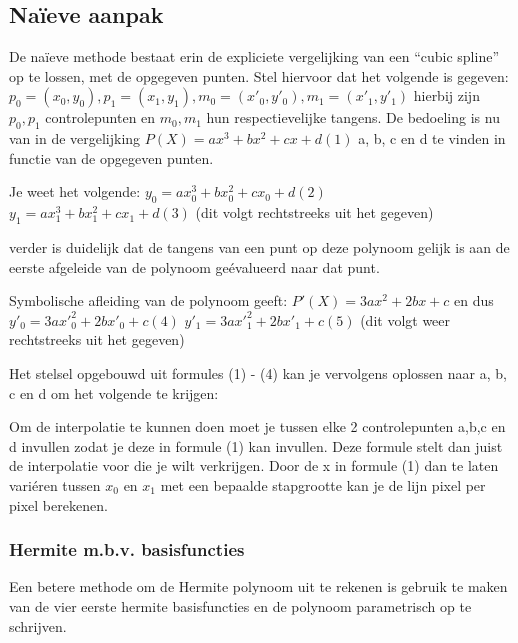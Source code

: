 \documentclass[a4paper,11pt,oneside, titlepage]{article}
\begin{document}
\subsection{Na\"ieve aanpak}
De na\"ieve methode bestaat erin de expliciete vergelijking van een ``cubic spline''
op te lossen, met de opgegeven punten.\newline
Stel hiervoor dat het volgende is gegeven:\newline
$p_0 = (x_0,y_0), p_1 = (x_1,y_1), m_0 = (x'_0, y'_0), m_1 = (x'_1, y'_1)$\newline
hierbij zijn $p_0,p_1$ controlepunten en $m_0, m_1$ hun respectievelijke tangens.\newline
\newline
De bedoeling is nu van in de vergelijking\newline
$P(X) = ax^3 + bx^2 + cx + d (1)$\newline
a, b, c en d te vinden in functie van de opgegeven punten.\newline

Je weet het volgende:
$y_0 = ax_0^3 + bx_0^2 + cx_0 + d (2)$\newline
$y_1 = ax_1^3 + bx_1^2 + cx_1 + d (3)$\newline
(dit volgt rechtstreeks uit het gegeven)\newline

verder is duidelijk dat de tangens van een punt op deze polynoom gelijk is aan de 
eerste afgeleide van de polynoom ge\'evalueerd naar dat punt.\newline

Symbolische afleiding van de polynoom geeft:
$P'(X) = 3ax^2 + 2bx + c$
en dus
$y'_0 = 3a{x'}_0^2 + 2bx'_0 + c (4)$\newline
$y'_1 = 3a{x'}_1^2 + 2bx'_1 + c (5)$\newline
(dit volgt weer rechtstreeks uit het gegeven)\newline

Het stelsel opgebouwd uit formules (1) - (4) kan je vervolgens oplossen naar a, b, c en d
om het volgende te krijgen:

Om de interpolatie te kunnen doen moet je tussen elke 2 controlepunten a,b,c en d invullen
zodat je deze in formule (1) kan invullen. Deze formule stelt dan juist de interpolatie 
voor die je wilt verkrijgen. Door de x in formule (1) dan te laten vari\'eren tussen 
$x_0$ en $x_1$ met een bepaalde stapgrootte kan je de lijn pixel per pixel berekenen.
\subsubsection{Hermite m.b.v. basisfuncties}
Een betere methode om de Hermite polynoom uit te rekenen is gebruik te maken van de vier 
eerste hermite basisfuncties en de polynoom parametrisch op te schrijven.
\end{document}
